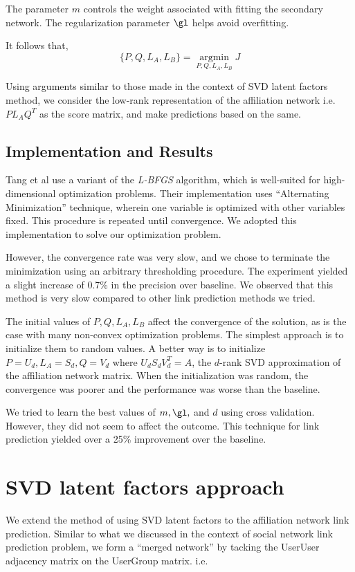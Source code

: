 \documentclass{report}
\begin{document}
The parameter $m$ controls the weight associated with fitting the secondary network. The regularization parameter $\gl$ helps  avoid overfitting.

It follows that,
\begin{equation*}
\{P, Q, L_A, L_B\} = \underset{P, Q, L_A, L_B}{\operatorname{argmin}} J
\end{equation*} 

Using arguments similar to those made in the context of SVD latent factors method, we consider the low-rank representation of the affiliation network i.e. $PL_AQ^T$ as the score matrix, and make predictions based on the same.


\subsection{Implementation and Results}
Tang\cite{tangLMF} et al use a variant of the \textit{L-BFGS} algorithm, which is well-suited for high-dimensional optimization problems. Their implementation uses ``Alternating Minimization'' technique, wherein one variable is optimized with other variables fixed. This procedure is repeated until convergence. We adopted this implementation to solve our optimization problem. 

However, the convergence rate was very slow, and we chose to terminate the minimization using an arbitrary thresholding procedure. The experiment yielded a slight increase of 0.7\% in the precision over baseline. We observed that this method is very slow compared to other link prediction methods we tried.

The initial values of $P, Q, L_A, L_B$ affect the convergence of the solution, as is the case with many non-convex optimization problems. The simplest approach is to initialize them to random values. A better way is to initialize $P = U_d, L_A=S_d, Q = V_d$ where $U_dS_dV_d^T = A$, the $d$-rank SVD approximation of the affiliation network matrix. When the initialization was random, the convergence was poorer and the performance was worse than the baseline.

We tried to learn the best values of $m, \gl,$ and $d$ using cross validation. However, they did not seem to affect the outcome. This technique for link prediction yielded over a 25\% improvement over the baseline.

\section{SVD latent factors approach}
We extend the method of using SVD latent factors to the affiliation network link prediction. Similar to what we discussed in the context of social network link prediction problem, we form a ``merged network'' by tacking the UserUser adjacency matrix on the UserGroup matrix. i.e.
\end{document}
